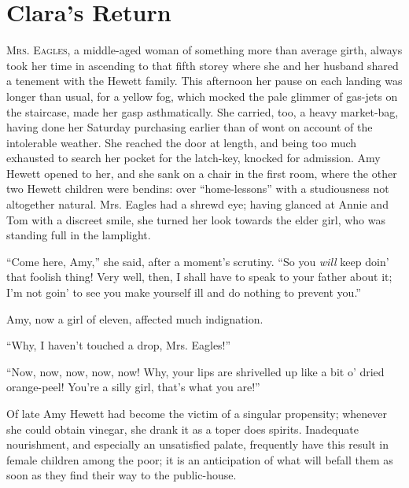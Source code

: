 \chapter{Clara's Return}

\textsc{Mrs. Eagles}, a middle-aged woman of something more than average
girth, always took her time in ascending to that fifth storey where she
and her husband shared a tenement with the Hewett family. This afternoon
her pause on each landing was longer than usual, for a yellow fog, which
mocked the pale glimmer of gas-jets on the staircase, made her gasp
asthmatically. She carried, too, a heavy market-bag, having done her
Saturday purchasing earlier than of wont on account of the intolerable
weather. She reached the door at length, and being too much exhausted to
search her pocket for the latch-key, knocked for admission. Amy Hewett
opened to her, and she sank on a chair in the first room, where the
other two Hewett children were bendins: over ``home-lessons'' with a
{}studiousness not altogether natural. Mrs. Eagles had a shrewd eye;
having glanced at Annie and Tom with a discreet smile, she turned her
look towards the elder girl, who was standing full in the lamplight.

``Come here, Amy,'' she said, after a moment's scrutiny. ``So you
\emph{will} keep doin' that foolish thing! Very well, then, I shall have
to speak to your father about it; I'm not goin' to see you make yourself
ill and do nothing to prevent you.''

Amy, now a girl of eleven, affected much indignation.

``Why, I haven't touched a drop, Mrs. Eagles!''

``Now, now, now, now, now! Why, your lips are shrivelled up like a bit
o' dried orange-peel! You're a silly girl, that's what you are!''

Of late Amy Hewett had become the victim of a singular propensity;
whenever she could obtain vinegar, she drank it as a toper does spirits.
Inadequate nourishment, and especially an unsatisfied palate, frequently
have this result in female children among the poor; {}it is an
anticipation of what will befall them as soon as they find their way to
the public-house.

